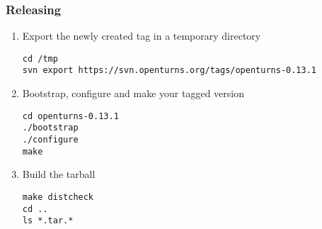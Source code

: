 \documentclass[11pt]{article}
\begin{document}
\subsubsection{Releasing}

\begin{enumerate}

\item Export the newly created tag in a temporary directory
\begin{verbatim}
cd /tmp
svn export https://svn.openturns.org/tags/openturns-0.13.1
\end{verbatim}

\item Bootstrap, configure and make your tagged version

\begin{verbatim}
cd openturns-0.13.1
./bootstrap
./configure
make
\end{verbatim}

\item Build the tarball
\begin{verbatim}
make distcheck
cd ..
ls *.tar.*
\end{verbatim}
\end{enumerate}
\end{document}
